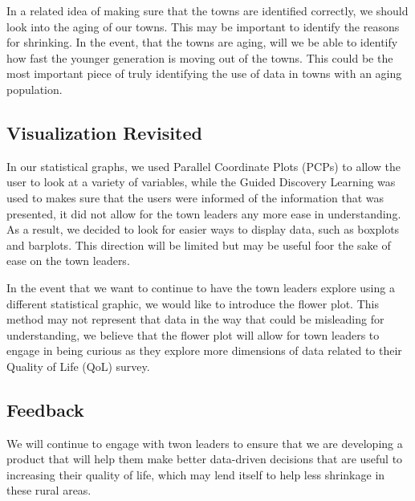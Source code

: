 \documentclass[letterpaper,inpress]{jdsart}
\begin{document}
In a related idea of making sure that the towns are identified correctly, we should look into the aging of our towns. This may be important to identify the reasons for shrinking. In the event, that the towns are aging, will we be able to identify how fast the younger generation is moving out of the towns. This could be the most important piece of truly identifying the use of data in towns with an aging population.

\subsection{Visualization Revisited}

In our statistical graphs, we used Parallel Coordinate Plots (PCPs) to allow the user to look at a variety of variables, while the Guided Discovery Learning was used to makes sure that the users were informed of the information that was presented, it did not allow for the town leaders any more ease in understanding. As a result, we decided to look for easier ways to display data, such as boxplots and barplots. This direction will be limited but may be useful foor the sake of ease on the town leaders.

In the event that we want to continue to have the town leaders explore using a different statistical graphic, we would like to introduce the flower plot. This method may not represent that data in the way that could be misleading for understanding, we believe that the flower plot will allow for town leaders to engage in being curious as they explore more dimensions of data related to their Quality of Life (QoL) survey.

\subsection{Feedback}

We will continue to engage with twon leaders to ensure that we are developing a product that will help them make better data-driven decisions that are useful to increasing their quality of life, which may lend itself to help less shrinkage in these rural areas.



\end{document}
